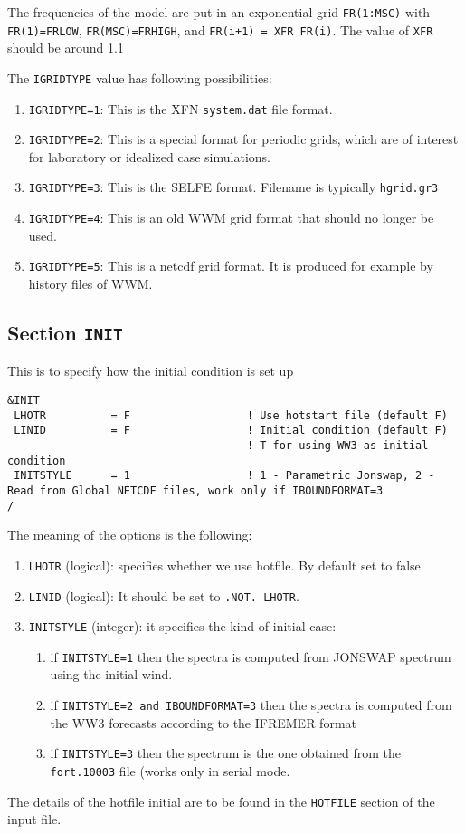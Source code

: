 \documentclass[12pt]{amsart}
\begin{document}
The frequencies of the model are put in an exponential grid {\tt FR(1:MSC)} with {\tt FR(1)=FRLOW}, {\tt FR(MSC)=FRHIGH}, and {\tt FR(i+1) = XFR FR(i)}. The value of {\tt XFR} should be around 1.1

The {\tt IGRIDTYPE} value has following possibilities:
\begin{enumerate}
\item {\tt IGRIDTYPE=1}: This is the XFN {\tt system.dat} file format.
\item {\tt IGRIDTYPE=2}: This is a special format for periodic grids, which are of interest for laboratory or idealized case simulations.
\item {\tt IGRIDTYPE=3}: This is the SELFE format. Filename is typically {\tt hgrid.gr3}
\item {\tt IGRIDTYPE=4}: This is an old WWM grid format that should no longer be used.
\item {\tt IGRIDTYPE=5}: This is a netcdf grid format. It is produced for example by history files of WWM.
\end{enumerate}




\subsection{Section {\tt INIT}}
This is to specify how the initial condition is set up
\begin{verbatim}
&INIT
 LHOTR          = F                  ! Use hotstart file (default F)
 LINID          = F                  ! Initial condition (default F)
                                     ! T for using WW3 as initial condition
 INITSTYLE      = 1                  ! 1 - Parametric Jonswap, 2 - Read from Global NETCDF files, work only if IBOUNDFORMAT=3
/
\end{verbatim}
The meaning of the options is the following:
\begin{enumerate}
\item {\tt LHOTR} (logical): specifies whether we use hotfile. By default set to false.
\item {\tt LINID} (logical): It should be set to {\tt .NOT. LHOTR}.
\item {\tt INITSTYLE} (integer): it specifies the kind of initial case:
  \begin{enumerate}
  \item if {\tt INITSTYLE=1} then the spectra is computed from JONSWAP spectrum using the initial wind.
  \item if {\tt INITSTYLE=2 and IBOUNDFORMAT=3} then the spectra is computed from the WW3 forecasts according to the IFREMER format
  \item if {\tt INITSTYLE=3} then the spectrum is the one obtained from the {\tt fort.10003} file (works only in serial mode.
  \end{enumerate}
\end{enumerate}
The details of the hotfile initial are to be found in the {\tt HOTFILE} section of the input file.
\end{document}
